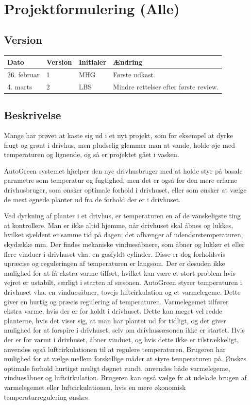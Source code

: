 \chapter{Projektformulering (Alle)}
\section{Version}
\begin{table}[h]
	\centering
	\begin{tabularx}{\textwidth - 2cm}{|l|l| l|X|}
	\hline
	Dato	& Version	& Initialer & Ændring	\\ \hline
	26. februar & 1 & MHG & Første udkast. \\ \hline
	4. marts & 2 & LBS & Mindre rettelser efter første review. \\ \hline
	\end{tabularx}
\end{table}
\section{Beskrivelse}
Mange har prøvet at kaste sig ud i et nyt projekt, som for eksempel at dyrke frugt og grønt i drivhus, men pludselig glemmer man at vande, holde øje med temperaturen og lignende, og så er projektet gået i vasken.
 
AutoGreen systemet hjælper den nye drivhusbruger med at holde styr på basale parametre som temperatur og fugtighed, men det er også for den mere erfarne drivhusbruger, som ønsker optimale forhold i drivhuset, eller som ønsker at vælge de mest egnede planter ud fra de forhold der er i drivhuset.
 
Ved dyrkning af planter i et drivhus, er temperaturen en af de vanskeligste ting at kontrollere. Man er ikke altid hjemme, når drivhuset skal åbnes og lukkes, hvilket sjældent er samme tid på dagen; det afhænger af udendørstemperaturen, skydække mm. 
Der findes mekaniske vinduesåbnere, som åbner og lukker et eller flere vinduer i drivhuset vha. en gasfyldt cylinder. 
Disse er dog forholdsvis upræcise og reguleringen af temperaturen er langsom. Der er desuden ikke mulighed for at få ekstra varme tilført, hvilket kan være et stort problem hvis vejret er ustabilt, særligt i starten af sæsonen. 
AutoGreen styrer temperaturen i drivhuset vha. en vinduesåbner, tovejs luftcirkulation og et varmelegeme. 
Dette giver en hurtig og præcis regulering af temperaturen. Varmelegemet tilfører ekstra varme, hvis der er for koldt i drivhuset. 
Dette kan meget vel redde planterne, hvis det viser sig, at man har plantet ud for tidligt, og det giver mulighed for at forspire i drivhuset, selv om drivhussæsonen ikke er startet. 
Hvis der er for varmt i drivhuset, åbner vinduet, og hvis dette ikke er tilstrækkeligt, anvendes også luftcirkulationen til at regulere temperaturen. 
Brugeren har mulighed for at vælge mellem forskellige måder at styre temperaturen på. Ønskes optimale forhold hurtigst muligt døgnet rundt, anvendes både varmelegeme, vinduesåbner og luftcirkulation. 
Brugeren kan også vælge fx at udelade brugen af varmelegemet eller luftcirkulationen, hvis en mere økonomisk temperaturregulering ønskes. 
 
